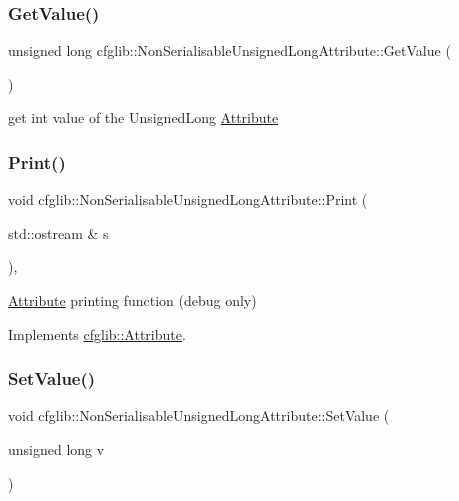 \subsubsection{\texorpdfstring{Get\+Value()}{GetValue()}}
{\footnotesize\ttfamily unsigned long cfglib\+::\+Non\+Serialisable\+Unsigned\+Long\+Attribute\+::\+Get\+Value (\begin{DoxyParamCaption}{ }\end{DoxyParamCaption})\hspace{0.3cm}{\ttfamily [inline]}}

get int value of the Unsigned\+Long \hyperlink{classcfglib_1_1Attribute}{Attribute} \mbox{\label{classcfglib_1_1NonSerialisableUnsignedLongAttribute_aef0e4a5bc60b6d4f278ab2daa553f598}} 
\subsubsection{\texorpdfstring{Print()}{Print()}}
{\footnotesize\ttfamily void cfglib\+::\+Non\+Serialisable\+Unsigned\+Long\+Attribute\+::\+Print (\begin{DoxyParamCaption}\item[{std\+::ostream \&}]{s }\end{DoxyParamCaption})\hspace{0.3cm}{\ttfamily [inline]}, {\ttfamily [virtual]}}

\hyperlink{classcfglib_1_1Attribute}{Attribute} printing function (debug only) 

Implements \hyperlink{classcfglib_1_1Attribute_af8d87ceddde146b92727e61823e0129b}{cfglib\+::\+Attribute}.

\mbox{\label{classcfglib_1_1NonSerialisableUnsignedLongAttribute_aea6d8fd0b4f145dc69d54f21d95f09cc}} 
\subsubsection{\texorpdfstring{Set\+Value()}{SetValue()}}
{\footnotesize\ttfamily void cfglib\+::\+Non\+Serialisable\+Unsigned\+Long\+Attribute\+::\+Set\+Value (\begin{DoxyParamCaption}\item[{unsigned long}]{v }\end{DoxyParamCaption})\hspace{0.3cm}{\ttfamily [inline]}}

